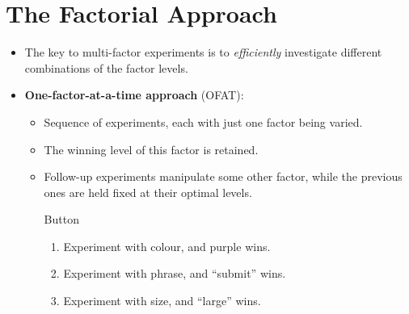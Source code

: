 \section{The Factorial Approach}
\begin{itemize}
      \item The key to multi-factor experiments is to \emph{efficiently} investigate different combinations of the factor
            levels.
      \item \textbf{One-factor-at-a-time approach} (OFAT):
            \begin{itemize}
                  \item Sequence of experiments, each with just one factor being varied.
                  \item The winning level of this factor is retained.
                  \item Follow-up experiments manipulate some other factor, while the previous ones are held fixed at
                        their optimal levels.
                        \begin{Example}{Button}{}
                              \begin{enumerate}[1.]
                                    \item Experiment with colour, and purple wins.
                                    \item Experiment with phrase, and ``submit'' wins.
                                    \item Experiment with size, and ``large'' wins.
                              \end{enumerate}
                        \end{Example}
            \end{itemize}
\end{itemize}
